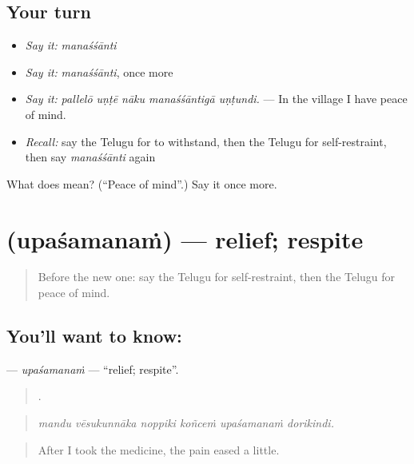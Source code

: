 \subsection*{Your turn}
\begin{itemize}
\raggedright
  \item \emph{Say it:} \emph{manaśśānti}
  \item \emph{Say it:} \emph{manaśśānti}, once more
  \item \emph{Say it:} \emph{pallelō uṇṭē nāku manaśśāntigā uṇṭundi.} — In the village I have peace of mind.
  \item \emph{Recall:} say the Telugu for to withstand, then the Telugu for self-restraint, then say \emph{manaśśānti} again
\end{itemize}

\begin{tcolorbox}[breakable,colback=teal!4,colframe=teal!35!black,title={Before you move on}]
What does  mean? (\textquotedblleft{}Peace of mind\textquotedblright{}.) Say it once more.
\end{tcolorbox}
\section[\texorpdfstring{\te{ఉపశమనం} (upaśamanaṁ)}{ఉపశమనం (upaśamanaṁ)}]{ (upaśamanaṁ) — relief; respite}

\label{lesson:TE-C506-upasamanam}



\begin{quote}
Before the new one: say the Telugu for self-restraint, then the Telugu for peace of mind.
\end{quote}

\subsection*{You'll want to know: }
\textbf{} — \emph{upaśamanaṁ} — \textquotedblleft{}relief; respite\textquotedblright{}.

\begin{quote}
     .
\end{quote}

\begin{quote}
\emph{mandu vēsukunnāka noppiki koñceṁ upaśamanaṁ dorikindi.}
\end{quote}

\begin{quote}
After I took the medicine, the pain eased a little.
\end{quote}

